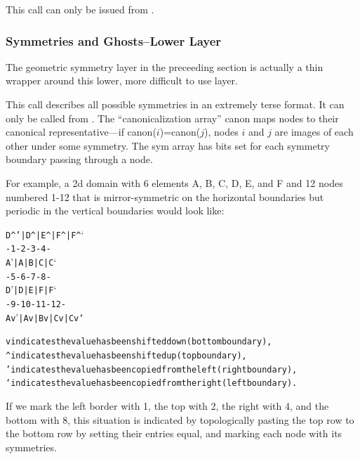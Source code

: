 \documentclass[10pt]{article}
\begin{document}
This call can only be issued from .



\subsubsection{Symmetries and Ghosts--Lower Layer}

The geometric symmetry layer in the preceeding section is actually
a thin wrapper around this lower, more difficult to use layer.


This call describes all possible symmetries in an extremely terse format.
It can only be called from .
The ``canonicalization array'' canon maps nodes to their canonical 
representative---if canon($i$)=canon($j$), nodes $i$ and $j$ are 
images of each other under some symmetry.  The sym array has bits set
for each symmetry boundary passing through a node.

For example, a 2d domain with 6 elements A, B, C, D, E, and F and 12 
nodes numbered 1-12 that is 
mirror-symmetric on the horizontal boundaries but periodic in the 
vertical boundaries would look like:

\begin{alltt}
   D^'|  D^ |  E^ |  F^ |  F^`
   -  1  -  2  -  3  -  4  -
   A' |  A  |  B  |  C  |  C`
   -  5  -  6  -  7  -  8  -
   D' |  D  |  E  |  F  |  F`
   -  9  - 10  -  11 -  12 -
   Av'|  Av |  Bv |  Cv |  Cv`

  v indicates the value has been shifted down (bottom boundary),
  ^ indicates the value has been shifted up (top boundary),
  ' indicates the value has been copied from the left (right boundary),
  ` indicates the value has been copied from the right (left boundary).
\end{alltt}

If we mark the left border with 1, the top with 2, the right with 4,
and the bottom with 8, this situation is indicated by topologically pasting the 
top row to the bottom row by setting their  entries equal, and 
marking each node with its symmetries.
\end{document}

